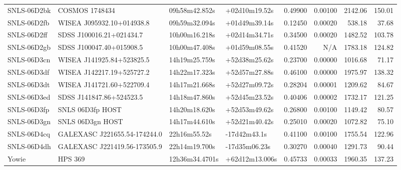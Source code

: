 \begin{longtable}{llllrrrr}
SNLS-06D2bk      &                  COSMOS 1748434 &   09h58m42.852s &   +02d10m19.52s &  0.49900 &  0.00100 &  2142.06 &      150.01 \\
SNLS-06D2fb      &       WISEA J095932.10+014938.8 &   09h59m32.094s &   +01d49m39.14s &  0.12450 &  0.00020 &   538.18 &       37.68 \\
SNLS-06D2ff      &        SDSS J100016.21+021434.7 &   10h00m16.218s &   +02d14m34.71s &  0.34500 &  0.00020 &  1482.52 &      103.78 \\
SNLS-06D2gb      &        SDSS J100047.40+015908.5 &   10h00m47.408s &   +01d59m08.55s &  0.41520 &      N/A &  1783.18 &      124.82 \\
SNLS-06D3cn      &       WISEA J141925.84+523825.5 &   14h19m25.759s &   +52d38m25.62s &  0.23700 &  0.00000 &  1016.68 &       71.17 \\
SNLS-06D3df      &       WISEA J142217.19+525727.2 &   14h22m17.323s &   +52d57m27.88s &  0.46100 &  0.00000 &  1975.97 &      138.32 \\
SNLS-06D3dt      &       WISEA J141721.60+522709.4 &   14h17m21.668s &   +52d27m09.72s &  0.28204 &  0.00001 &  1209.62 &       84.67 \\
SNLS-06D3ed      &        SDSS J141847.86+524523.5 &   14h18m47.860s &   +52d45m23.52s &  0.40406 &  0.00002 &  1732.17 &      121.25 \\
SNLS-06D3fp      &                SNLS 06D3fp HOST &   14h20m18.620s &   +52d53m49.62s &  0.26800 &  0.00100 &  1149.42 &       80.57 \\
SNLS-06D3gn      &                SNLS 06D3gn HOST &   14h17m44.610s &   +52d21m40.42s &  0.25010 &  0.00020 &  1072.82 &       75.10 \\
SNLS-06D4cq      &  GALEXASC J221655.54-174244.0   &    22h16m55.52s &    -17d42m43.1s &  0.41100 &  0.00100 &  1755.54 &      122.96 \\
SNLS-06D4dh      &  GALEXASC J221419.56-173505.9   &   22h14m19.700s &   -17d35m06.23s &  0.30270 &  0.00040 &  1291.73 &       90.44 \\
Yowie            &                         HPS 369 &  12h36m34.4701s &  +62d12m13.006s &  0.45733 &  0.00033 &  1960.35 &      137.23 \\
\end{longtable}
